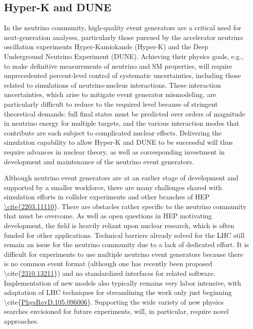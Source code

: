 \subsection{Hyper-K and DUNE}\label{hyper-k-and-dune}

In the neutrino community, high-quality event generators are a critical
need for next-generation analyses, particularly those pursued by the
accelerator neutrino oscillation experiments Hyper-Kamiokande (Hyper-K)
and the Deep Underground Neutrino Experiment (DUNE). Achieving their
physics goals, e.g., to make definitive measurements of neutrino and SM
properties, will require unprecedented percent-level control of
systematic uncertainties, including those related to simulations of
neutrino-nucleus interactions. These interaction uncertainties, which
arise to mitigate event generator mismodeling, are particularly
difficult to reduce to the required level because of stringent
theoretical demands: full final states must be predicted over orders of
magnitude in neutrino energy for multiple targets, and the various
interaction modes that contribute are each subject to complicated
nuclear effects. Delivering the simulation capability to allow Hyper-K
and DUNE to be successful will thus require advances in nuclear theory,
as well as corresponding investment in development and maintenance of
the neutrino event generators.

Although neutrino event generators are at an earlier stage of
development and supported by a smaller workforce, there are many
challenges shared with simulation efforts in collider experiments and
other branches of HEP
\href{https://arxiv.org/abs/2203.11110}{\ul{\textbackslash cite\{2203.11110}}\}.
There are obstacles rather specific to the neutrino community that must
be overcome. As well as open questions in HEP motivating development,
the field is heavily reliant upon nuclear research, which is often
funded for other applications. Technical barriers already solved for the
LHC still remain an issue for the neutrino community due to a lack of
dedicated effort. It is difficult for experiments to use multiple
neutrino event generators because there is no common event format
(although one has recently been proposed
\textbackslash cite\{\href{https://arxiv.org/abs/2310.13211}{\ul{2310.13211}}\})
and no standardized interfaces for related software. Implementation of
new models also typically remains very labor intensive, with adaptation
of LHC techniques for streamlining the work only just beginning
\textbackslash cite\{\href{https://doi.org/10.1103/PhysRevD.105.096006}{\ul{PhysRevD.105.096006}}\}.
Supporting the wide variety of new physics searches envisioned for
future experiments, will, in particular, require novel approaches.

